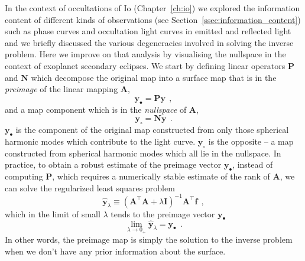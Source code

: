 \documentclass[12pt,dvipsnames]{report}
\renewcommand{\vec}[1]{\boldsymbol{\mathbf{#1}}}
\newcommand{\hquad}{~~}
\begin{document}
In the context of occultations of Io (Chapter~\ref{ch:io}) we explored the 
information content of different kinds of observations 
(see Section~\ref{ssec:information_content}) such as phase curves and occultation light curves 
in emitted and reflected light and we briefly discussed the various degeneracies involved 
in solving the inverse problem. Here we improve on that analysis by visualising the 
nullspace in the context of exoplanet secondary eclipses. 
We start by defining linear operators
$\mathbf{P}$ and $\mathbf{N}$ \citep[see Appendix A in][]{2021AJ....162..123L} which
decompose the original map into a surface map that is in the \emph{preimage} of the linear mapping
$\vec{A}$,
\begin{equation}
    \mathbf{y}_{\bullet}=\mathbf{P} \mathbf{y}
    \hquad,
\end{equation}
and a map component which is in the \emph{nullspace} of $\vec A$,
\begin{equation}
    \mathbf{y}_{\circ}=\mathbf{N} \mathbf{y}
    \hquad.
    \label{eq:preimage}
\end{equation}
$\mathbf{y}_{\bullet}$ is the component of the original map constructed from only those
spherical harmonic modes which contribute to the light curve. $\mathbf{y}_{\circ}$ is the
opposite -- a map constructed from spherical harmonic modes which all lie in the nullspace.
In practice, to obtain a robust estimate of the preimage vector $\mathbf{y}_{\bullet}$,
instead of computing $\mathbf{P}$, which requires a numerically stable estimate
of the rank of $\mathbf{A}$, 
we can solve the regularized least squares problem
\begin{equation}
    \hat{\mathbf{y}}_{\lambda}\equiv (\mathbf{A}^\intercal \mathbf{A} + \lambda \mathbf{I})^{-1} \mathbf{A}^\intercal \mathbf{f}
    \hquad,
    \label{eq:preimage_lsq}
\end{equation}
which in the limit of small $\lambda$ tends to the preimage vector $\mathbf{y}_{\bullet}$
\citep[see, for instance, ][]{hogg2021}
\begin{equation}
    \lim _{\lambda \rightarrow 0_{+}} \hat{\mathbf{y}}_{\lambda}=\mathbf{y}_{\boldsymbol{\bullet}}
    \hquad.
\end{equation}
In other words, the preimage map is simply the solution to the inverse problem when we don't have any
prior information about the surface.
\end{document}
